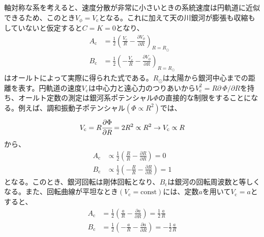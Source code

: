 軸対称な系を考えると、速度分散が非常に小さいときの系統速度は円軌道に近似できるため、このとき$V_{\phi}=V_{\mathrm{c}}$となる。これに加えて天の川銀河が膨張も収縮もしていないと仮定すると$C=K=0$となり、
\begin{subequations}
\begin{align}
	A_{\mathrm{c}} &=\frac{1}{2}\left( \frac{V_{\mathrm{c}}}{R} - \frac{\partial V_{\phi}}{\partial R} \right)_{R=R_{\odot}} \\
	B_{\mathrm{c}} &=\frac{1}{2}\left( -\frac{V_{\mathrm{c}}}{R} - \frac{\partial V_{\phi}}{\partial R} \right)_{R=R_{\odot}}
\end{align} \label{ABsym}
\end{subequations}
はオールトによって実際に得られた式である。$R_{\odot}$は太陽から銀河中心までの距離を表す。円軌道の速度$V_{\mathrm{c}}$は中心力と遠心力のつりあいから$V_{\mathrm{c}}^2=R \partial\ \Phi/\partial R$を持ち、オールト定数の測定は銀河系ポテンシャル$\Phi$の直接的な制限をすることになる。例えば、調和振動子ポテンシャル$(\Phi \propto R^2)$では、
\begin{align}
\begin{aligned}
    V_{\mathrm{c}} = R \cfrac{\partial \Phi}{\partial R} = 2R^2 \propto R^2 \to V_{\mathrm{c}} \propto R
\end{aligned}
\end{align}
から、
\begin{subequations}
\begin{align}
	A_{\mathrm{c}} &\propto\frac{1}{2}\left( \frac{R}{R} - \frac{\partial R}{\partial R} \right) = 0\\
	B_{\mathrm{c}} &\propto \frac{1}{2}\left( -\frac{R}{R} - \frac{\partial R}{\partial R} \right) = 1
\end{align}
\end{subequations}
となる。このとき、銀河回転は剛体回転となり、$B_{\mathrm{c}}$は銀河の回転周波数と等しくなる。また、回転曲線が平坦なとき$(V_{\mathrm{c}}=\mathrm{const})$には、定数$a$を用いて$V_{\mathrm{c}} = a$とすると、
\begin{subequations}
\begin{align}
	A_{\mathrm{c}} &=\frac{1}{2}\left( \frac{a}{R} - \frac{\partial a}{\partial R} \right) = \frac{1}{2}\frac{a}{R}\\
	B_{\mathrm{c}} &=\frac{1}{2}\left( -\frac{a}{R} - \frac{\partial a}{\partial R} \right) = -\frac{1}{2}\frac{a}{R}
\end{align}
\end{subequations}
